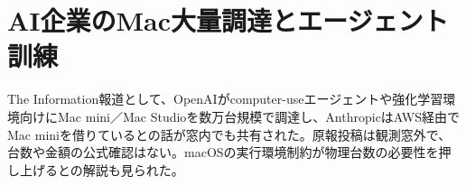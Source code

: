 \section{AI企業のMac大量調達とエージェント訓練}
The Information報道として、OpenAIがcomputer-useエージェントや強化学習環境向けにMac mini／Mac Studioを数万台規模で調達し、AnthropicはAWS経由でMac miniを借りているとの話が窓内でも共有された。原報投稿は観測窓外で、台数や金額の公式確認はない。macOSの実行環境制約が物理台数の必要性を押し上げるとの解説も見られた。
